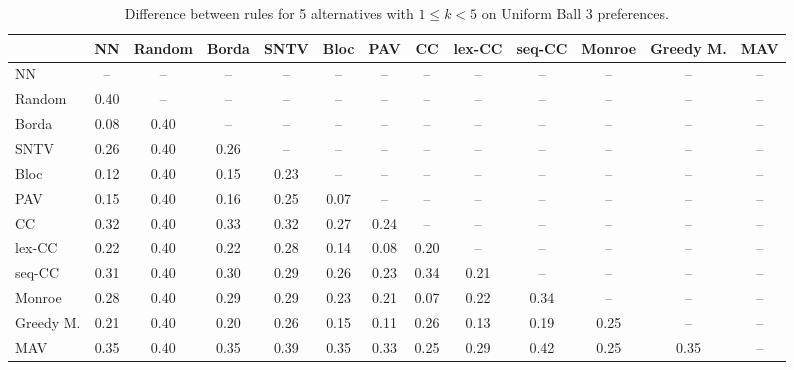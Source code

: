 
\begin{table*}[h!]
\centering
\begin{tabular}{lcccccccccccc}
\toprule
 & NN & Random & Borda & SNTV & Bloc & PAV & CC & lex-CC & seq-CC & Monroe & Greedy M. & MAV \\
\midrule
NN & -- & -- & -- & -- & -- & -- & -- & -- & -- & -- & -- & -- \\
Random & 0.40 & -- & -- & -- & -- & -- & -- & -- & -- & -- & -- & -- \\
Borda & 0.08 & 0.40 & -- & -- & -- & -- & -- & -- & -- & -- & -- & -- \\
SNTV & 0.26 & 0.40 & 0.26 & -- & -- & -- & -- & -- & -- & -- & -- & -- \\
Bloc & 0.12 & 0.40 & 0.15 & 0.23 & -- & -- & -- & -- & -- & -- & -- & -- \\
PAV & 0.15 & 0.40 & 0.16 & 0.25 & 0.07 & -- & -- & -- & -- & -- & -- & -- \\
CC & 0.32 & 0.40 & 0.33 & 0.32 & 0.27 & 0.24 & -- & -- & -- & -- & -- & -- \\
lex-CC & 0.22 & 0.40 & 0.22 & 0.28 & 0.14 & 0.08 & 0.20 & -- & -- & -- & -- & -- \\
seq-CC & 0.31 & 0.40 & 0.30 & 0.29 & 0.26 & 0.23 & 0.34 & 0.21 & -- & -- & -- & -- \\
Monroe & 0.28 & 0.40 & 0.29 & 0.29 & 0.23 & 0.21 & 0.07 & 0.22 & 0.34 & -- & -- & -- \\
Greedy M. & 0.21 & 0.40 & 0.20 & 0.26 & 0.15 & 0.11 & 0.26 & 0.13 & 0.19 & 0.25 & -- & -- \\
MAV & 0.35 & 0.40 & 0.35 & 0.39 & 0.35 & 0.33 & 0.25 & 0.29 & 0.42 & 0.25 & 0.35 & -- \\
\bottomrule
\end{tabular}

\caption{Difference between rules for 5 alternatives with $1 \leq k < 5$ on Uniform Ball 3 preferences.}
\end{table*}
